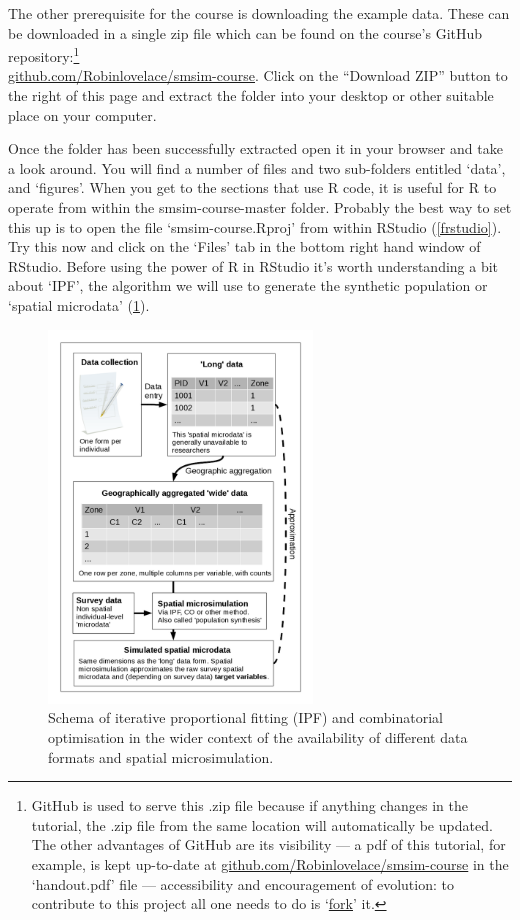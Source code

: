 \documentclass[a4paper, 11pt, twoside]{article}
\begin{document}
The other prerequisite for the course is downloading the example data.
These can be downloaded in a single zip file which can be found on the
course's GitHub repository:\footnote{GitHub
is used to serve this .zip file because if anything changes
in the tutorial, the .zip file from the same location will
automatically be updated. The other advantages of GitHub are its
visibility --- a pdf of this tutorial, for example,
is kept up-to-date at 
\href{https://github.com/Robinlovelace/smsim-course/blob/master/handout.pdf}{github.com/Robinlovelace/smsim-course}
in the `handout.pdf' file --- accessibility and encouragement of evolution: to contribute
to this project all one needs to do is
`\href{https://help.github.com/articles/fork-a-repo}{fork}' it.
} \\
\href{https://github.com/Robinlovelace/smsim-course}{github.com/Robinlovelace/smsim-course}.
Click on the ``Download ZIP'' button to the right of this page and extract
the folder into your desktop or other suitable place on your computer.

Once the folder has been successfully extracted open it in
your browser and take a look around. You will find a number of files
and two sub-folders
entitled `data', and `figures'. When you get to the
sections that use R code, it is useful for R to operate from
within the smsim-course-master folder. Probably the best way
to set this up is to open the file `smsim-course.Rproj' from
within RStudio (\cref{frstudio}).
Try this now and click on the `Files' tab in
the bottom right hand window of RStudio.
Before using the power of R in RStudio it's worth
understanding a bit about `IPF', the algorithm we will use to generate
the synthetic population or `spatial microdata' (\cref{fmsim-schema}).

\begin{figure}[H]
\begin{center}
\includegraphics[width=7cm]{msim-schema}
\end{center}
\caption{Schema of iterative proportional fitting (IPF) and combinatorial
optimisation
in the wider context of the availability of different data formats and spatial
microsimulation. \label{fmsim-schema}}
\end{figure}
\end{document}
